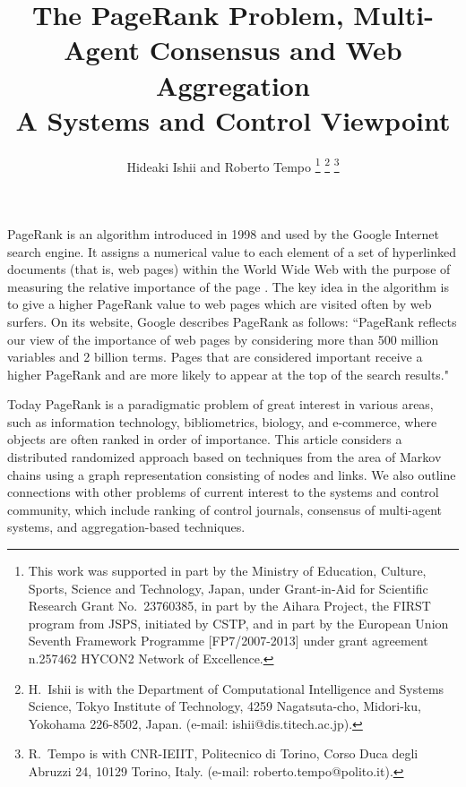 \documentclass[11pt,draftcls,onecolumn]{IEEEtran}
\begin{document}
\title{The PageRank Problem, Multi-Agent Consensus and Web Aggregation\\
{\Large A Systems and Control Viewpoint}
}

\author{Hideaki Ishii
and
Roberto Tempo
\thanks{This work was supported in part by the Ministry of Education, Culture, Sports, 
Science and Technology, Japan, under Grant-in-Aid for Scientific Research Grant 
No.~23760385, in part by the Aihara Project, the FIRST program from JSPS, initiated
by CSTP, and in part by the European Union
Seventh Framework Programme [FP7/2007-2013] under grant agreement n.257462 HYCON2 Network
of Excellence.}
\thanks{H.~Ishii is with the Department of Computational Intelligence 
and Systems Science, Tokyo Institute of Technology,
4259 Nagatsuta-cho, Midori-ku, Yokohama 226-8502, Japan.
(e-mail: ishii@dis.titech.ac.jp).} 
\thanks{R.~Tempo is with CNR-IEIIT, Politecnico di Torino, 
Corso Duca degli Abruzzi 24, 10129 Torino, Italy.
(e-mail: roberto.tempo@polito.it).}}


\maketitle



PageRank is an algorithm introduced in 1998 and used by the Google Internet search engine.
It assigns a numerical value to each element of a set of hyperlinked documents 
(that is, web pages) within the World Wide Web with the purpose of measuring 
the relative importance of the page \cite{google:13}. 
The key idea in the algorithm is to give a higher PageRank value to 
web pages which are visited often by web surfers.
On its website, Google describes PageRank as follows:
``PageRank reflects our view of the importance of web pages by considering 
more than 500 million variables and 2 billion terms. Pages that are considered
important receive a higher PageRank and are more likely to appear at 
the top of the search results."

Today PageRank is a paradigmatic problem 
of great interest in various areas, such as
information technology, bibliometrics, biology, and e-commerce, 
where objects are often ranked in order of importance. 
This article considers a distributed randomized approach based on 
techniques from the area of Markov chains 
using a graph representation consisting of nodes and links.
We also outline connections with other 
problems of current interest to the systems and control community, 
which include ranking of control journals, consensus of multi-agent 
systems, and aggregation-based techniques.
\end{document}
